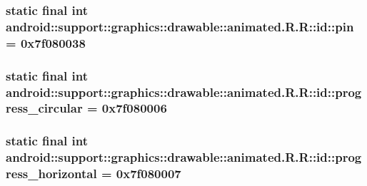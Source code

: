 \hypertarget{classandroid_1_1support_1_1graphics_1_1drawable_1_1animated_1_1_r_1_1id_eba0a19aeb5af8ffdd3cb367ee90f927}{
\subsubsection[{pin}]{\setlength{\rightskip}{0pt plus 5cm}static final int android::support::graphics::drawable::animated.R.R::id::pin = 0x7f080038}}
\label{classandroid_1_1support_1_1graphics_1_1drawable_1_1animated_1_1_r_1_1id_eba0a19aeb5af8ffdd3cb367ee90f927}


\hypertarget{classandroid_1_1support_1_1graphics_1_1drawable_1_1animated_1_1_r_1_1id_28663997e3e8c4c80a3675e498415a83}{
\subsubsection[{progress\_\-circular}]{\setlength{\rightskip}{0pt plus 5cm}static final int android::support::graphics::drawable::animated.R.R::id::progress\_\-circular = 0x7f080006}}
\label{classandroid_1_1support_1_1graphics_1_1drawable_1_1animated_1_1_r_1_1id_28663997e3e8c4c80a3675e498415a83}


\hypertarget{classandroid_1_1support_1_1graphics_1_1drawable_1_1animated_1_1_r_1_1id_e46f3f984b25ea291eaa2fbf9e753ce2}{
\subsubsection[{progress\_\-horizontal}]{\setlength{\rightskip}{0pt plus 5cm}static final int android::support::graphics::drawable::animated.R.R::id::progress\_\-horizontal = 0x7f080007}}
\label{classandroid_1_1support_1_1graphics_1_1drawable_1_1animated_1_1_r_1_1id_e46f3f984b25ea291eaa2fbf9e753ce2}


